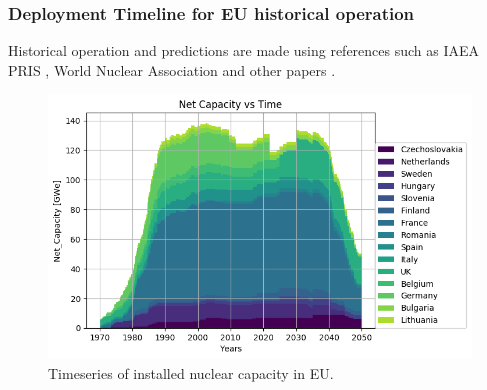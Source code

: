 \begin{frame}
	\frametitle{Deployment Timeline for EU historical operation}
	Historical operation and predictions are made using references such as IAEA PRIS \cite{iaea_pris_nodate},
	World Nuclear Association \cite{world_nuclear_association_nuclear_2017} and other papers
	\cite{joskow_future_2012, hatch_politics_2015}.
	\begin{figure}[htbp!]
		\begin{center}
			\includegraphics[width=.8\linewidth,height=.8\textheight,keepaspectratio]{./images/eu_future/power_plot.png}
		\end{center}
		\caption{Timeseries of installed nuclear capacity in \gls{EU}.}
		\label{fig:eu_pow}
	\end{figure}
	
\end{frame}

